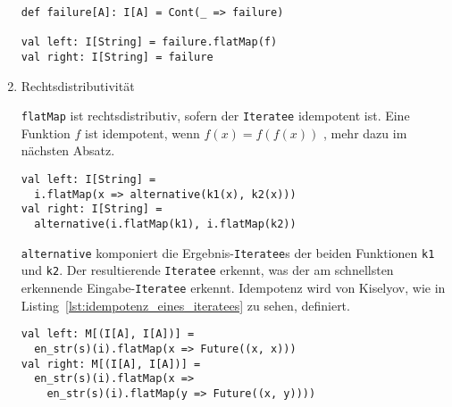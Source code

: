 \begin{enumerate}
    \begin{lstlisting}[caption=Nullelementregel, label=lst:nullelementregel]
def failure[A]: I[A] = Cont(_ => failure)

val left: I[String] = failure.flatMap(f)
val right: I[String] = failure
\end{lstlisting}

  \item Rechtsdistributivität

    \lstinline|flatMap| ist rechtsdistributiv, sofern der \lstinline|Iteratee| idempotent ist.
    Eine Funktion $f$ ist idempotent, wenn $f(x) = f(f(x))$ \cite[vgl.][S.~1]{idempotence}, mehr dazu im nächsten Absatz.

    \begin{lstlisting}[caption=Rechtsdistributivitätsregel, label=lst:rechtsdistributivitaetsregel]
val left: I[String] =
  i.flatMap(x => alternative(k1(x), k2(x)))
val right: I[String] =
  alternative(i.flatMap(k1), i.flatMap(k2))
\end{lstlisting}

    \lstinline|alternative| komponiert die Ergebnis-\lstinline|Iteratee|s der beiden Funktionen \lstinline|k1| und \lstinline|k2|.
    Der resultierende \lstinline|Iteratee| erkennt, was der am schnellsten erkennende Eingabe-\lstinline|Iteratee| erkennt.
    Idempotenz wird von Kiselyov, wie in Listing~\ref{lst:idempotenz_eines_iteratees} zu sehen, definiert.

    \begin{lstlisting}[caption=Idempotenz eines Iteratees, label=lst:idempotenz_eines_iteratees]
val left: M[(I[A], I[A])] =
  en_str(s)(i).flatMap(x => Future((x, x)))
val right: M[(I[A], I[A])] =
  en_str(s)(i).flatMap(x =>
    en_str(s)(i).flatMap(y => Future((x, y))))
\end{lstlisting}
\end{enumerate}





